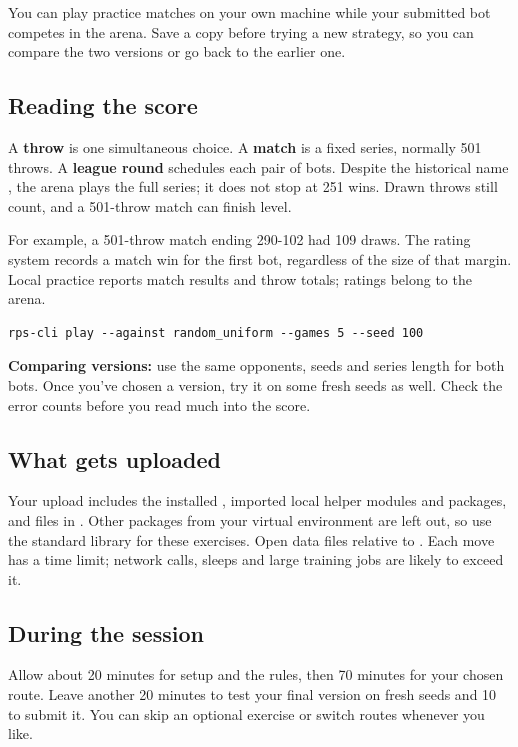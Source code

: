 
\begin{context}
You can play practice matches on your own machine while your submitted bot competes in the arena. Save a copy before trying a new strategy, so you can compare the two versions or go back to the earlier one.

\end{context}

\subsection*{Reading the score}

A \textbf{throw} is one simultaneous choice. A \textbf{match} is a fixed series, normally 501 throws. A \textbf{league round} schedules each pair of bots. Despite the historical name , the arena plays the full series; it does not stop at 251 wins. Drawn throws still count, and a 501-throw match can finish level.


For example, a 501-throw match ending 290-102 had 109 draws. The rating system records a match win for the first bot, regardless of the size of that margin. Local practice reports match results and throw totals; ratings belong to the arena.


\begin{lstlisting}[style=shell,numbers=none,xleftmargin=4pt,framexleftmargin=0pt]
rps-cli play --against random_uniform --games 5 --seed 100
\end{lstlisting}

\begin{checkpoint}
\textbf{Comparing versions:} use the same opponents, seeds and series length for both bots. Once you've chosen a version, try it on some fresh seeds as well. Check the error counts before you read much into the score.
\end{checkpoint}

\subsection*{What gets uploaded}

Your upload includes the installed , imported local helper modules and packages, and files in . Other packages from your virtual environment are left out, so use the standard library for these exercises. Open data files relative to . Each move has a time limit; network calls, sleeps and large training jobs are likely to exceed it.


\subsection*{During the session}

Allow about 20 minutes for setup and the rules, then 70 minutes for your chosen route. Leave another 20 minutes to test your final version on fresh seeds and 10 to submit it. You can skip an optional exercise or switch routes whenever you like.
\par
